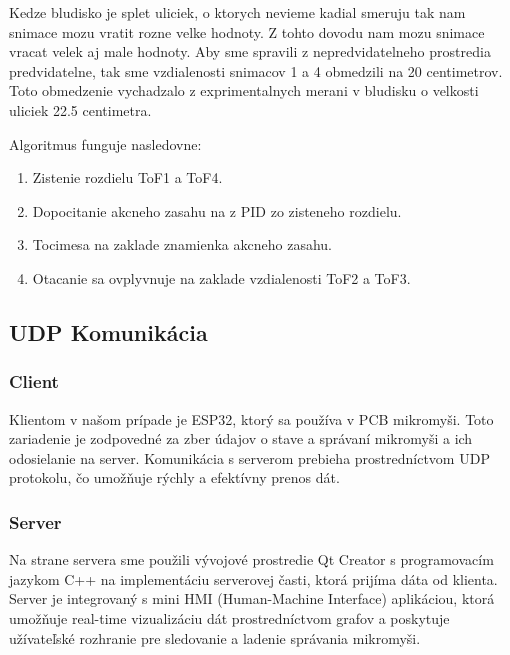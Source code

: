 Kedze bludisko je splet uliciek, o ktorych nevieme kadial smeruju tak nam snimace mozu vratit rozne velke hodnoty. Z
tohto dovodu nam mozu snimace vracat velek aj male hodnoty. Aby sme spravili z nepredvidatelneho prostredia
predvidatelne, tak sme vzdialenosti snimacov 1 a 4 obmedzili na 20 centimetrov. Toto obmedzenie vychadzalo z
exprimentalnych merani v bludisku o velkosti uliciek 22.5 centimetra.

Algoritmus funguje nasledovne:
\begin{enumerate}
	\item Zistenie rozdielu ToF1 a ToF4.
	\item Dopocitanie akcneho zasahu na z PID zo zisteneho rozdielu.
	\item Tocimesa na zaklade znamienka akcneho zasahu.
	\item Otacanie sa ovplyvnuje na zaklade vzdialenosti ToF2 a ToF3.
\end{enumerate}


\subsection{UDP Komunikácia}

\subsubsection{Client}

Klientom v našom prípade je ESP32, ktorý sa používa v PCB mikromyši. Toto zariadenie je zodpovedné za zber údajov o stave a správaní mikromyši a ich odosielanie na server. Komunikácia s serverom prebieha prostredníctvom UDP protokolu, čo umožňuje rýchly a efektívny prenos dát.

\subsubsection{Server}

Na strane servera sme použili vývojové prostredie Qt Creator s programovacím jazykom C++ na implementáciu serverovej časti, ktorá prijíma dáta od klienta. Server je integrovaný s mini HMI (Human-Machine Interface) aplikáciou, ktorá umožňuje real-time vizualizáciu dát prostredníctvom grafov a poskytuje užívateľské rozhranie pre sledovanie a ladenie správania mikromyši.

